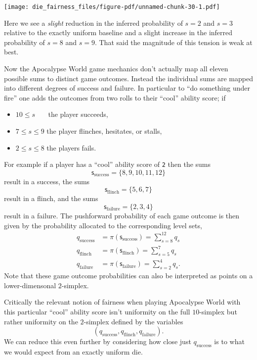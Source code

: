 \documentclass[
  letterpaper,
  DIV=11,
  numbers=noendperiod]{scrartcl}
\providecommand{\tightlist}{%
  \setlength{\itemsep}{0pt}\setlength{\parskip}{0pt}}\usepackage{longtable,booktabs,array}
\begin{document}
\texttt{[image: die\_fairness\_files/figure-pdf/unnamed-chunk-30-1.pdf]}

Here we see a \emph{slight} reduction in the inferred probability of
\(s = 2\) and \(s = 3\) relative to the exactly uniform baseline and a
slight increase in the inferred probability of \(s = 8\) and \(s = 9\).
That said the magnitude of this tension is weak at best.

Now the Apocalypse World game mechanics don't actually map all eleven
possible sums to distinct game outcomes. Instead the individual sums are
mapped into different degrees of success and failure. In particular to
``do something under fire'' one adds the outcomes from two rolls to
their ``cool'' ability score; if

\begin{itemize}
\tightlist
\item
  \(10 \le s \quad\;\;\) the player succeeds,
\item
  \(7  \le s \le 9\) the player flinches, hesitates, or stalls,
\item
  \(2  \le s \le 8\) the players fails.
\end{itemize}

For example if a player has a ``cool'' ability score of \texttt{2} then
the sums \[
\mathsf{s}_{\mathrm{success}} = \{ 8, 9, 10, 11, 12 \}
\] result in a success, the sums \[
\mathsf{s}_{\mathrm{flinch}} = \{ 5, 6, 7 \}
\] result in a flinch, and the sums \[
\mathsf{s}_{\mathrm{failure}} = \{ 2, 3, 4 \}
\] result in a failure. The pushforward probability of each game outcome
is then given by the probability allocated to the corresponding level
sets, \begin{align*}
q_{\mathrm{success}}
&=
\pi( \mathsf{s}_{\mathrm{success}} ) = \sum_{s = 8}^{12} q_{s}
\\
q_{\mathrm{flinch}}
&=
\pi( \mathsf{s}_{\mathrm{flinch}} ) = \sum_{s = 5}^{7} q_{s}
\\
q_{\mathrm{failure}}
&=
\pi( \mathsf{s}_{\mathrm{failure}} ) = \sum_{s = 2}^{4} q_{s}.
\end{align*} Note that these game outcome probabilities can also be
interpreted as points on a lower-dimensonal \(2\)-simplex.

Critically the relevant notion of fairness when playing Apocalypse World
with this particular ``cool'' ability score isn't uniformity on the full
\(10\)-simplex but rather uniformity on the \(2\)-simplex defined by the
variables \[
(q_{\mathrm{success}}, q_{\mathrm{flinch}}, q_{\mathrm{failure}}) .
\] We can reduce this even further by considering how close just
\(q_{\mathrm{success}}\) is to what we would expect from an exactly
uniform die.
\end{document}

